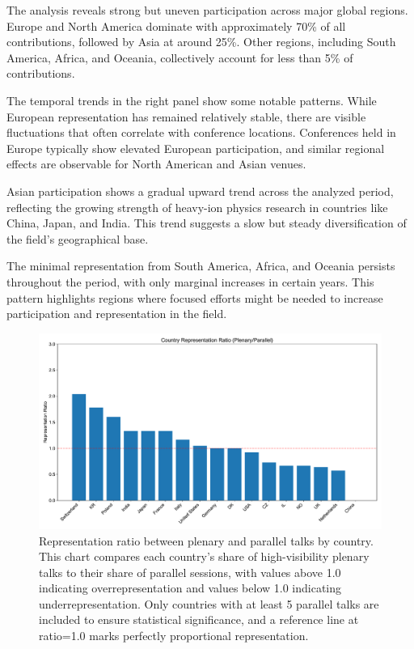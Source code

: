 \documentclass[a4paper,11pt]{article}
\begin{document}
The analysis reveals strong but uneven participation across major global regions. Europe and North America dominate with approximately 70\% of all contributions, followed by Asia at around 25\%. Other regions, including South America, Africa, and Oceania, collectively account for less than 5\% of contributions.

The temporal trends in the right panel show some notable patterns. While European representation has remained relatively stable, there are visible fluctuations that often correlate with conference locations. Conferences held in Europe typically show elevated European participation, and similar regional effects are observable for North American and Asian venues.

Asian participation shows a gradual upward trend across the analyzed period, reflecting the growing strength of heavy-ion physics research in countries like China, Japan, and India. This trend suggests a slow but steady diversification of the field's geographical base.

The minimal representation from South America, Africa, and Oceania persists throughout the period, with only marginal increases in certain years. This pattern highlights regions where focused efforts might be needed to increase participation and representation in the field.

\begin{figure}[H]
\centering
\includegraphics[width=\textwidth]{figures/representation_ratio.pdf}
\caption{Representation ratio between plenary and parallel talks by country. This chart compares each country's share of high-visibility plenary talks to their share of parallel sessions, with values above 1.0 indicating overrepresentation and values below 1.0 indicating underrepresentation. Only countries with at least 5 parallel talks are included to ensure statistical significance, and a reference line at ratio=1.0 marks perfectly proportional representation.}
\label{fig:representation_ratio}
\end{figure}
\end{document}
